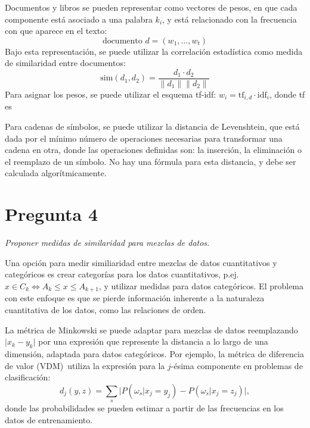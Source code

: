\documentclass[spanish]{article}
\newcommand{\pregunta}{\textit}
\newcommand{\given}{\vert}
\newcommand{\abs}[1]{\lvert#1\rvert}
\newcommand{\norm}[1]{\lVert#1\rVert}
\begin{document}
\begin{itemize}
            Documentos y libros se pueden representar como vectores de pesos, en que cada componente
            está asociado a una palabra $k_i$, y está relacionado con la frecuencia con que aparece en el
            texto:
            \begin{equation}
                \text{documento $d$} = (w_1, \ldots, w_t)
            \end{equation}
            Bajo esta representación, se puede utilizar la correlación estadística como medida de
            similaridad entre documentos:
            \begin{equation}
                \text{sim}(d_1, d_2) = \frac{d_1\cdot d_2}{\norm{d_1}\norm{d_2}}
            \end{equation}
            Para asignar los pesos, se puede utilizar el esquema tf-idf:  $w_i =
            \text{tf}_{i,d}\cdot\text{idf}_i$, donde tf es 


            Para cadenas de símbolos, se puede utilizar la distancia de
            Levenshtein, que está dada por el mínimo número de operaciones
            necesarias para transformar una cadena en otra, donde las
            operaciones definidas son: la inserción, la eliminación o el
            reemplazo de un símbolo.  No hay una fórmula para esta distancia, y
            debe ser calculada algorítmicamente.


    \end{itemize}

\section*{Pregunta 4}
\pregunta{Proponer medidas de similaridad para mezclas de datos.}

Una opción para medir similiaridad entre mezclas de datos cuantitativos y categóricos es crear
categorías para los datos cuantitativos, p.ej. $x\in C_k\iff A_k\leq x\leq A_{k+1}$, y utilizar
medidas para datos categóricos.  El problema con este enfoque es que se pierde información
inherente a la naturaleza cuantitativa de los datos, como las relaciones de orden.

La métrica de Minkowski se puede adaptar para mezclas de datos reemplazando $\abs{x_k - y_k}$ por
una expresión que represente la distancia a lo largo de una dimensión, adaptada para datos
categóricos.  Por ejemplo, la métrica de diferencia de valor (VDM)~\footnotemark utiliza la
expresión para la $j$-ésima componente en problemas de clasificación:
\begin{equation}
    d_j(y, z) = \sum_{s}\bigl\lvert P(\omega_s\given x_j = y_j) -
                                    P(\omega_s\given x_j = z_j)\bigr\rvert,
\end{equation}
donde las probabilidades se pueden estimar a partir de las frecuencias en los datos de
entrenamiento.

\end{document}
